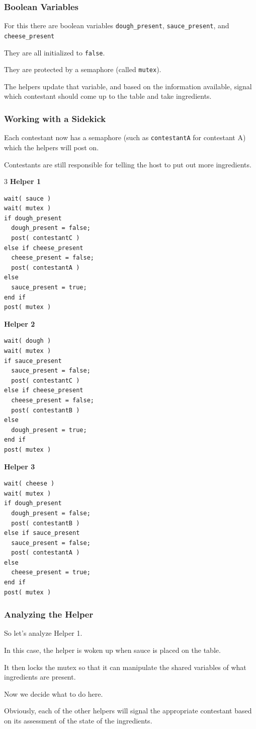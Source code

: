 \begin{frame}
	\frametitle{Boolean Variables}

	For this there are boolean variables \texttt{dough\_present}, \texttt{sauce\_present}, and \texttt{cheese\_present}

	They are all initialized to \texttt{false}.

	They are protected by a semaphore (called \texttt{mutex}).

	The helpers update that variable, and based on the information available, signal which contestant should come up to the table and take ingredients.

\end{frame}

\begin{frame}[fragile]
	\frametitle{Working with a Sidekick}

	Each contestant now has a semaphore (such as \texttt{contestantA} for contestant A) which the helpers will post on.

	Contestants are still responsible for telling the host to put out more ingredients.

	\begin{multicols}{3}
		\textbf{Helper 1}
		\begin{lstlisting}
wait( sauce )
wait( mutex )
if dough_present  
  dough_present = false;
  post( contestantC )
else if cheese_present
  cheese_present = false;
  post( contestantA )
else
  sauce_present = true;
end if  
post( mutex )
\end{lstlisting}
		\columnbreak
		\textbf{Helper 2}
		\begin{lstlisting}
wait( dough )
wait( mutex )
if sauce_present  
  sauce_present = false;
  post( contestantC )
else if cheese_present
  cheese_present = false;
  post( contestantB )
else
  dough_present = true;
end if  
post( mutex )
\end{lstlisting}
		\columnbreak
		\textbf{Helper 3}
		\begin{lstlisting}
wait( cheese )
wait( mutex )
if dough_present  
  dough_present = false;
  post( contestantB )
else if sauce_present
  sauce_present = false;
  post( contestantA )
else
  cheese_present = true;
end if  
post( mutex )
\end{lstlisting}
	\end{multicols}

\end{frame}

\begin{frame}
	\frametitle{Analyzing the Helper}

	So let's analyze Helper 1.

	In this case, the helper is woken up when sauce is placed on the table.

	It then locks the mutex so that it can manipulate the shared variables of what ingredients are present.

	Now we decide what to do here.

	Obviously, each of the other helpers will signal the appropriate contestant based on its assessment of the state of the ingredients.

\end{frame}


